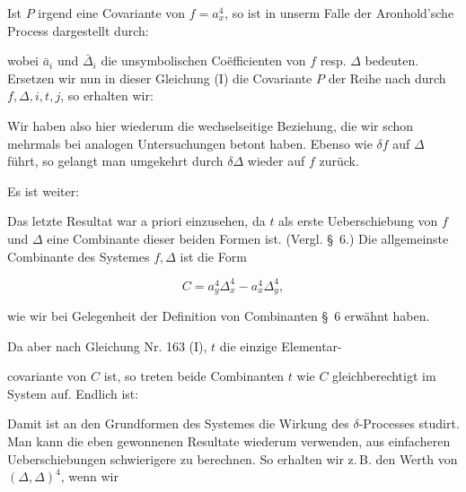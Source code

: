 Ist $P$ irgend eine Covariante von $f=a_x^4$, so ist in unserm Falle der Aronhold'sche Process dargestellt durch:




wobei $\bar a_i$ und $\bar\Delta_i$ die unsymbolischen Co\"efficienten von $f$ resp. $\Delta$ bedeuten. Ersetzen wir nun in dieser Gleichung (I) die Covariante $P$ der Reihe nach durch $f, \Delta, i, t, j$, so erhalten wir:



Wir haben also hier wiederum die wechselseitige Beziehung, die wir schon mehrmals bei analogen Untersuchungen betont haben. Ebenso wie $\delta f$ auf $\Delta$ führt, so gelangt man umgekehrt durch $\delta\Delta$ wieder auf $f$ zurück.

Es ist weiter:



Das letzte Resultat war a priori einzusehen, da $t$ als erste Ueberschiebung von $f$ und $\Delta$ eine Combinante dieser beiden Formen ist. (Vergl. \S~6.) Die allgemeinste Combinante des Systemes $f, \Delta$ ist die Form

\[
C = a_y^4\Delta_x^4 - a_x^4\Delta_y^4,
\]

wie wir bei Gelegenheit der Definition von Combinanten \S~6 erwähnt haben.

Da aber nach Gleichung Nr. 163 (I), $t$ die einzige Elementar-



covariante von $C$ ist, so treten beide Combinanten $t$ wie $C$ gleichberechtigt im System auf. Endlich ist:


Damit ist an den Grundformen des Systemes die Wirkung des $\delta$-Processes studirt. Man kann die eben gewonnenen Resultate wiederum verwenden, aus einfacheren Ueberschiebungen schwierigere zu berechnen. So erhalten wir z.\,B. den Werth von $(\Delta,\Delta)^4$, wenn wir

